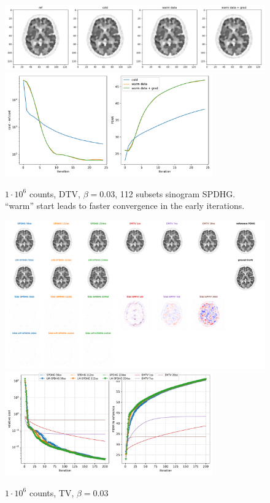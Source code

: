 \begin{figure}
  \centering
    \includegraphics[width=1.0\textwidth]{figs/SPDHG_sino_init.png}
    \includegraphics[width=0.8\textwidth]{figs/SPDHG_sino_init_metrics.pdf}
  \caption{$1\cdot10^6$ counts, DTV, $\beta = 0.03$, 112 subsets sinogram SPDHG. ``warm'' start leads to faster convergence in the early iterations.}
  \label{fig:metrics}
\end{figure}


\begin{figure}
  \centering
    \includegraphics[width=1.0\textwidth]{./figs/brain2d_counts_1.0E+06_seed_1_beta_3.0E-02_prior_TV_niter_ref_20000_fwhm_4.5_4.5_niter_200.png}
    \includegraphics[width=0.8\textwidth]{./figs/brain2d_counts_1.0E+06_seed_1_beta_3.0E-02_prior_TV_niter_ref_20000_fwhm_4.5_4.5_niter_200_metrics.pdf}
  \caption{$1\cdot10^6$ counts, TV, $\beta = 0.03$}
  \label{fig:metrics}
\end{figure}

